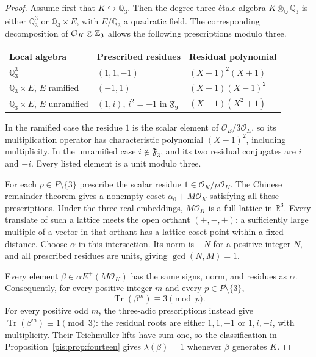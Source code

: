 \documentclass[11pt,a4paper]{article}
\theoremstyle{definition}\newtheorem{definition}[theorem]{Definition}
\theoremstyle{remark}\newtheorem{remark}[theorem]{Remark}
\newcommand{\F}{\mathfrak F}\newcommand{\FF}{\mathbb F}
\newcommand{\Q}{\mathbb Q}\newcommand{\R}{\mathbb R}
\newcommand{\Tr}{\operatorname{Tr}}\newcommand{\Nm}{\operatorname{N}}
\begin{document}
\begin{proof}
Assume first that $K\hookrightarrow\Q_3$. Then the degree-three
\'{e}tale algebra $K\otimes_\Q\Q_3$ is either
$\Q_3^3$ or $\Q_3\times E$, with $E/\Q_3$ a quadratic field.
The corresponding decomposition of $\mathcal O_K\otimes\mathbb Z_3$
allows the following prescriptions modulo three.
\begin{center}\small
\begin{tabular}{lll}
\toprule
Local algebra & Prescribed residues & Residual polynomial\\
\midrule
$\Q_3^3$ & $(1,1,-1)$ & $(X-1)^2(X+1)$\\
$\Q_3\times E$, $E$ ramified & $(-1,1)$ & $(X+1)(X-1)^2$\\
$\Q_3\times E$, $E$ unramified & $(1,i)$, $i^2=-1$ in $\F_9$ & $(X-1)(X^2+1)$\\
\bottomrule
\end{tabular}
\end{center}
In the ramified case the residue $1$ is the scalar element of
$\mathcal O_E/3\mathcal O_E$, so its multiplication operator has
characteristic polynomial $(X-1)^2$, including multiplicity. In the
unramified case $i\notin\F_3$, and its two residual conjugates
are $i$ and $-i$. Every listed element is a unit modulo three.

For each $p\in P\setminus\{3\}$ prescribe the scalar residue
$1\in\mathcal O_K/p\mathcal O_K$. The Chinese remainder theorem
gives a nonempty coset $\alpha_0+M\mathcal O_K$ satisfying all
these prescriptions. Under the three real embeddings,
$M\mathcal O_K$ is a full lattice in $\R^3$. Every translate of
such a lattice meets the open orthant $(+,-,+)$: a sufficiently
large multiple of a vector in that orthant has a lattice-coset
point within a fixed distance. Choose $\alpha$ in this intersection.
Its norm is $-N$ for a positive integer $N$, and all prescribed
residues are units, giving $\gcd(N,M)=1$.

Every element $\beta\in\alpha E^+(M\mathcal O_K)$ has the same
signs, norm, and residues as $\alpha$. Consequently, for every
positive integer $m$ and every $p\in P\setminus\{3\}$,
\[
 \Tr(\beta^m)\equiv3\pmod p.
\]
For every positive odd $m$, the three-adic prescriptions instead
give $\Tr(\beta^m)\equiv1\pmod3$: the residual roots are either
$1,1,-1$ or $1,i,-i$, with multiplicity. Their Teichm\"uller
lifts have sum one, so the classification in
Proposition~\ref{pis:prop:fourteen} gives $\lambda(\beta)=1$ whenever
$\beta$ generates $K$.


\end{proof}
\end{document}
